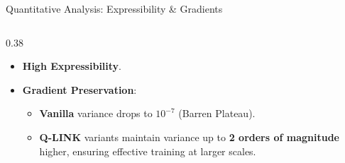 \documentclass[aspectratio=169,xcolor=dvipsnames]{beamer}
\begin{document}
\begin{frame}{Quantitative Analysis: Expressibility \& Gradients}
    \begin{columns}[c, onlytextwidth]
        \begin{column}{0.38\textwidth}
            \begin{KeyBox}
                \begin{itemize}
                    \item \textbf{High Expressibility}.
                    \item \textbf{Gradient Preservation}: 
                        \begin{itemize}
                            \item \textbf{Vanilla} variance drops to $10^{-7}$ (Barren Plateau).
                            \item \textbf{Q-LINK} variants maintain variance up to \textbf{2 orders of magnitude} higher, ensuring effective training at larger scales.
                        \end{itemize}
                \end{itemize}
            \end{KeyBox}
        \end{column}


\end{columns}
\end{frame}
\end{document}
